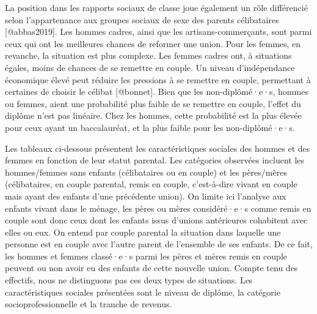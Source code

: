 \documentclass[
  12pt,
]{book}
\begin{document}
La position dans les rapports sociaux de classe joue également un rôle
différencié selon l'appartenance aux groupes sociaux de sexe des parents
célibataires {[}@abbas2019{]}. Les hommes cadres, ainsi que les
artisans-commerçants, sont parmi ceux qui ont les meilleures chances de
reformer une union. Pour les femmes, en revanche, la situation est plus
complexe. Les femmes cadres ont, à situations égales, moins de chances
de se remettre en couple. Un niveau d'indépendance économique élevé peut
réduire les pressions à se remettre en couple, permettant à certaines de
choisir le célibat {[}@bonnet{]}. Bien que les non-diplômé·e·s, hommes
ou femmes, aient une probabilité plus faible de se remettre en couple,
l'effet du diplôme n'est pas linéaire. Chez les hommes, cette
probabilité est la plus élevée pour ceux ayant un baccalauréat, et la
plus faible pour les non-diplômé·e·s.

Les tableaux ci-dessous présentent les caractéristiques sociales des
hommes et des femmes en fonction de leur statut parental. Les catégories
observées incluent les hommes/femmes sans enfants (célibataires ou en
couple) et les pères/mères (célibataires, en couple parental, remis en
couple, c'est-à-dire vivant en couple mais ayant des enfants d'une
précédente union). On limite ici l'analyse aux enfants vivant dans le
ménage, les pères ou mères considéré·e·s comme remis en couple sont donc
ceux dont les enfants issus d'unions antérieures cohabitent avec elles
ou eux. On entend par couple parental la situation dans laquelle une
personne est en couple avec l'autre parent de l'ensemble de ses enfants.
De ce fait, les hommes et femmes classé·e·s parmi les pères et mères
remis en couple peuvent ou non avoir eu des enfants de cette nouvelle
union. Compte tenu des effectifs, nous ne distinguons pas ces deux types
de situations. Les caractéristiques sociales présentées sont le niveau
de diplôme, la catégorie socioprofessionnelle et la tranche de revenus.
\end{document}
